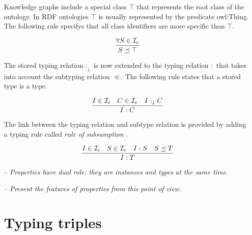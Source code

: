 \documentclass[runningheads]{llncs}
\newcommand{\darr}{\downarrow}
\newcommand{\Ii}{{\cal I}_i}
\newcommand{\Ic}{{\cal I}_c}
\newcommand{\memo}[1]{}
\newcommand{\notes}[1]{\noindent\begin{small}-- \emph{#1}\\\end{small}}
\begin{document}
Knowledge graphs include a special class $\top$ that represents the
root class of the ontology. In RDF ontologies $\top$ is usually
represented by the predicate owl:Thing. The following rule specifys
that all class identifiers are more specific than $\top$.

\begin{equation}
\dfrac{\forall\/S\in\Ic}
      {S\preceq\top}
\end{equation}

The stored typing relation $:_\darr$ is now extended to the typing
relation $:$ that takes into account the subtyping relation $\preceq$.
The following rule states that a stored type is a type.

\begin{equation}
\dfrac{I\in\Ii \quad C\in\Ic \quad I:_\darr\/C}
      {I:C}
\end{equation}

The link between the typing relation and subtype relation is provided
by adding a typing rule called \emph{rule of subsumption}
\cite{Pierce2002}.

\begin{equation}
\dfrac{I\in\Ii\quad S\in\Ic\quad I:S \quad S\preceq\/T}
      {I:T}    
\end{equation}


\notes{Properties have dual role: they are instances and types at the same time.}
\notes{Present the features of properties from this point of view.}

\memo{Put together the base types of ground identifiers using $\land$ type.}
\memo{First, the base type of an ground identifier is the $\land$ of all base types.}
\memo{The \emph{base type} of a ground identifier is defined explicitely!}

\memo{The lub types of base types B are the smallest types related to all base types.}
\memo{The lub types are related by $\land$ to form a (complete) type of a ground identifier.}
\memo{The complete type of a ground identifier is defined explicitely.}








\section{Typing triples\label{section:triples}}
\end{document}
